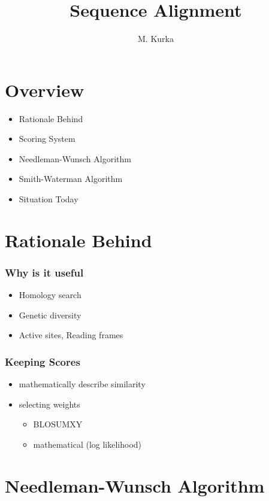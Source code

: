 \documentclass{beamer}
\title{Sequence Alignment}
\author{M. Kurka}
\begin{document}
\maketitle
\section{Overview}
\begin{frame}
\begin{itemize}
    \item Rationale Behind 
    \item Scoring System 
    \item Needleman-Wunsch Algorithm
    \item Smith-Waterman Algorithm
    \item Situation Today
\end{itemize}
\end{frame}

\section{Rationale Behind}
\begin{frame}
\frametitle{Why is it useful}
\begin{itemize}
    \item Homology search
    \item Genetic diversity
    \item Active sites, Reading frames
\end{itemize}
\end{frame}

\begin{frame}
 \frametitle{Keeping Scores}
 \begin{itemize}
     \item mathematically describe similarity
     \item selecting weights 
    \begin{itemize}
        \item BLOSUMXY
        \item mathematical (log likelihood)
    \end{itemize}
 \end{itemize}

\end{frame}

\section{Needleman-Wunsch Algorithm}
\end{document}
